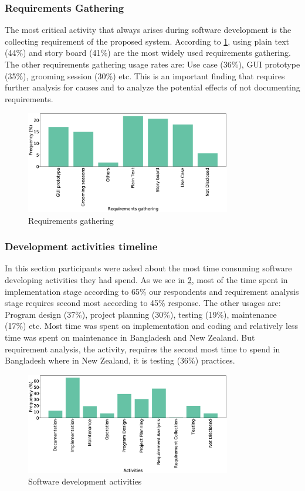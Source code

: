 \subsubsection{Requirements Gathering}
The most critical activity that always arises during software development is the collecting requirement of the proposed system. According to \cref{fig:requirements}, using plain text (44\%) and story board (41\%) are the most widely used requirements gathering. The other requirements gathering usage rates are: Use case (36\%), GUI prototype (35\%), grooming session (30\%) etc. This is an important finding that requires further analysis for causes and to analyze the potential effects of not documenting requirements.
\begin{figure}[htbp]
\centering
  \includegraphics[width=0.8\textwidth]{Figures/Requirements_Gathering}
  \caption{Requirements gathering}
  \label{fig:requirements}
\end{figure}

\subsubsection{Development activities timeline}
In this section participants were asked about the most time consuming software developing activities they had spend. As we see in \cref{fig:activities}, most of the time spent in implementation stage according to 65\% our respondents and requirement analysis stage requires second most according to 45\% response. The other usages are: Program design (37\%), project planning (30\%), testing (19\%), maintenance (17\%) etc. Most time was spent on implementation and coding and relatively less time was spent on maintenance in Bangladesh and New Zealand. But requirement analysis, the activity, requires the second most time to spend in Bangladesh where in New Zealand, it is testing (36\%) practices.

\begin{figure}[htbp]
\centering
  \includegraphics[width=0.8\textwidth]{Figures/Respondents_Activities}
  \caption{Software development activities}
  \label{fig:activities}
\end{figure}
